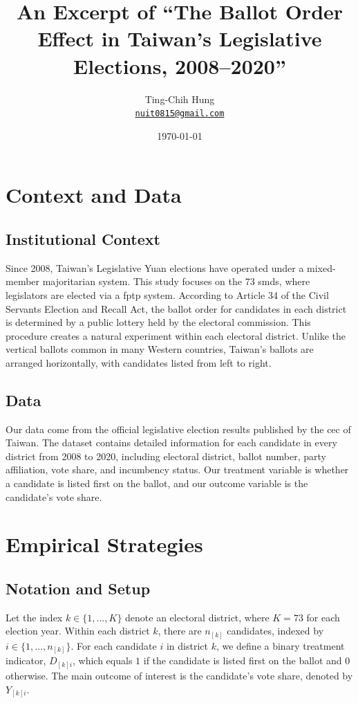 \documentclass[10pt]{article}
\title{An Excerpt of ``The Ballot Order Effect in Taiwan's Legislative Elections, 2008--2020''}
\author{Ting-Chih Hung \\ \href{mailto:nuit0815@gmail.com}{\texttt{nuit0815@gmail.com}}}
\date{\today}
\theoremstyle{sfstyle}
\theoremstyle{remark}
\begin{document}
\maketitle

\setcounter{section}{1}

\section{Context and Data} \label{sec:context-data}

\subsection{Institutional Context}

Since 2008, 
Taiwan's Legislative Yuan elections 
have operated under a mixed-member majoritarian system. 
This study focuses on the 73 \glspl{smd},
where legislators are elected via a \gls{fptp} system. 
According to Article 34 of the Civil Servants Election and Recall Act, 
the ballot order for candidates in each district 
is determined by a public lottery held by the electoral commission.
This procedure creates a natural experiment within each electoral district. 
Unlike the vertical ballots common in many Western countries, 
Taiwan's ballots are arranged horizontally, 
with candidates listed from left to right.

\subsection{Data}

Our data come from the official legislative election results
published by the \gls{cec} of Taiwan.
The dataset contains detailed information
for each candidate in every district from 2008 to 2020,
including electoral district,
ballot number, party affiliation, 
vote share, and incumbency status.
Our treatment variable is whether a candidate is listed first on the ballot,
and our outcome variable is the candidate's vote share.

\section{Empirical Strategies}

\subsection{Notation and Setup}

Let the index $k \in \{1, \ldots, K\}$ denote an electoral district, 
where $K=73$ for each election year. 
Within each district $k$, 
there are $n_{[k]}$ candidates,
indexed by $i \in \{1, \ldots, n_{[k]}\}$. 
For each candidate $i$ in district $k$, 
we define a binary treatment indicator, $D_{[k]i}$, 
which equals $1$ if the candidate is listed first on the ballot 
and $0$ otherwise. 
The main outcome of interest is the candidate's vote share, 
denoted by $Y_{[k]i}$.
\end{document}
